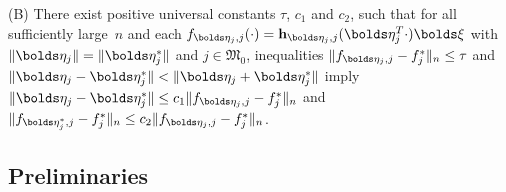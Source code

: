 \documentclass[aos,MSNbibl,dvips]{arximspdf}
\newcommand{\rrVert}{\Vert}
\newcommand{\llVert}{\Vert}
\newcommand{\btheta}{\bolds\theta}
\newcommand{\bfeta}{\bolds\eta}
\newcommand{\bxi}{\bolds\xi}
\newcommand{\bh}{{\mathbf h}}
\newcommand{\Mfrak}{\mathfrak{M}}
\begin{document}
\begin{appendix}
\begin{assumption}
(B) There exist positive universal constants $\tau$, $c_1$ and
$c_2$, such that for all sufficiently large~$n$ and each $f_{\bfeta
_j,j}(\cdot)=\bh_{\bfeta_j,j}(\bfeta_j^T\cdot)\bxi$ with~$\llVert
\bfeta_j\rrVert =\llVert \bfeta_j^*\rrVert $ and $j\in\Mfrak_0$,
inequalities $\llVert
f_{\bfeta_j,j} - f^*_j\rrVert _n\le\tau$ and $\llVert \bfeta_j-\bfeta
_j^*\rrVert <\llVert
\bfeta_j+\bfeta_j^*\rrVert $ imply $\llVert \bfeta_j-\bfeta
_j^*\rrVert \le c_1\llVert
f_{\bfeta_j,j} - f^*_j\rrVert _n$ and $\llVert f_{\bfeta_j^*,j} -
f^*_j\rrVert _n\le
c_2\llVert f_{\bfeta_j,j} - f^*_j\rrVert _n$.
\end{assumption}

\subsection{Preliminaries}



\end{appendix}
\end{document}
